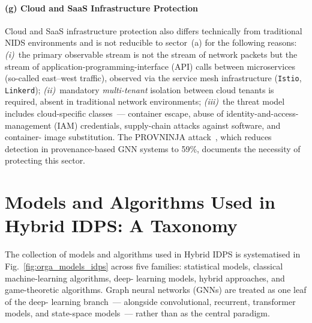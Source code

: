 \paragraph{(g) Cloud and SaaS Infrastructure Protection}\label{subsubsec:sector_cloud}

Cloud and SaaS infrastructure protection also differs technically
from traditional NIDS environments and is not reducible to
sector~(a) for the following reasons:
\emph{(i)}~the primary observable stream is not the stream of
network packets but the stream of application-programming-interface
(API) calls between microservices (so-called east--west traffic),
observed via the service mesh infrastructure
(\texttt{Istio}, \texttt{Linkerd});
\emph{(ii)}~mandatory \emph{multi-tenant} isolation between cloud
tenants is required, absent in traditional network environments;
\emph{(iii)}~the threat model includes cloud-specific classes~---
container escape, abuse of identity-and-access-management (IAM)
credentials, supply-chain attacks against software, and container-
image substitution. The PROVNINJA attack~\cite{PROVNINJA2023}, which
reduces detection in provenance-based GNN systems to 59\%,
documents the necessity of protecting this sector.
\fi

\section{Models and Algorithms Used in Hybrid IDPS: A Taxonomy}
\label{sec:idps_models_taxonomy}%

The collection of models and algorithms used in Hybrid IDPS is
systematised in Fig.~\ref{fig:orga_models_idps} across five families:
statistical models, classical machine-learning algorithms, deep-
learning models, hybrid approaches, and game-theoretic algorithms. Graph neural networks (GNNs) are treated as one leaf of the deep-
learning branch~--- alongside convolutional, recurrent, transformer
models, and state-space models~--- rather than as the central
paradigm.


